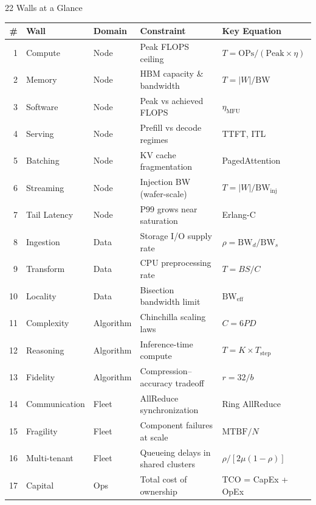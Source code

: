 \begin{frame}{22 Walls at a Glance}
\centering
\scriptsize
\setlength{\tabcolsep}{3pt}
\begin{tabular}{@{}rllll@{}}
\toprule
\textbf{\#} & \textbf{Wall} & \textbf{Domain} & \textbf{Constraint} & \textbf{Key Equation} \\
\midrule
1  & Compute       & Node      & Peak FLOPS ceiling            & $T = \text{OPs} / (\text{Peak} \times \eta)$ \\
2  & Memory        & Node      & HBM capacity \& bandwidth     & $T = |W| / \text{BW}$ \\
3  & Software      & Node      & Peak vs achieved FLOPS        & $\eta_{\text{MFU}}$ \\
4  & Serving       & Node      & Prefill vs decode regimes     & TTFT, ITL \\
5  & Batching      & Node      & KV cache fragmentation        & PagedAttention \\
6  & Streaming     & Node      & Injection BW (wafer-scale)    & $T = |W| / \text{BW}_{\text{inj}}$ \\
7  & Tail Latency  & Node      & P99 grows near saturation     & Erlang-C \\
\midrule
8  & Ingestion     & Data      & Storage I/O supply rate       & $\rho = \text{BW}_d / \text{BW}_s$ \\
9  & Transform     & Data      & CPU preprocessing rate        & $T = BS / C$ \\
10 & Locality      & Data      & Bisection bandwidth limit     & $\text{BW}_{\text{eff}}$ \\
\midrule
11 & Complexity    & Algorithm & Chinchilla scaling laws       & $C = 6PD$ \\
12 & Reasoning     & Algorithm & Inference-time compute        & $T = K \times T_{\text{step}}$ \\
13 & Fidelity      & Algorithm & Compression--accuracy tradeoff & $r = 32/b$ \\
\midrule
14 & Communication & Fleet     & AllReduce synchronization     & Ring AllReduce \\
15 & Fragility     & Fleet     & Component failures at scale   & $\text{MTBF}/N$ \\
16 & Multi-tenant  & Fleet     & Queueing delays in shared clusters & $\rho / [2\mu(1{-}\rho)]$ \\
\midrule
17 & Capital       & Ops       & Total cost of ownership       & TCO = CapEx + OpEx \\

\end{tabular}
\end{frame}
